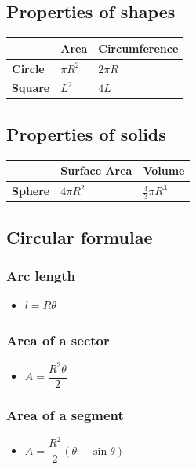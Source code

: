 \documentclass[]{report}
\newcommand \tab[1][1cm]{\hspace*{#1}}
\newcommand{\itemt}{\item \tab}
\begin{document}
\def\arraystretch{1.5}

		\subsection{Properties of shapes}
\begin{tabular}{|l|l|l|}
\hline
				& \textbf{Area} 		& \textbf{Circumference}
\\ \hline 
\textbf{Circle}	& \( \pi R^2 \)			& \( 2 \pi R \)
\\ \hline
\textbf{Square} & \( L^2	\)			& \( 4L \)
\\ \hline
\end{tabular}

		\subsection{Properties of solids}
\begin{tabular}{|l|l|l|}
\hline
				& \textbf{Surface Area} & \textbf{Volume}
\\ \hline 
\textbf{Sphere}	& \( 4\pi R^2 \)		& \( \frac{4}{3} \pi R^3 \)
\\ \hline
\end{tabular}

		\subsection{Circular formulae}

\subsubsection{Arc length}
\begin{itemize}
\itemt \( l = R\theta \)
\end{itemize}

\subsubsection{Area of a sector}
\begin{itemize}
\itemt \( A = \dfrac{R^2\theta}{2} \)
\end{itemize}

\subsubsection{Area of a segment}
\begin{itemize}
\itemt \( A = \dfrac{R^2}{2} (\theta - \sin\theta) \)
\end{itemize}
\end{document}
